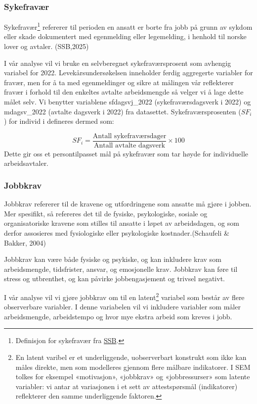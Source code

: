 \documentclass[
  12pt,
  a4paper,
  DIV=11,
  numbers=noendperiod]{scrartcl}
\begin{document}
\subsubsection{Sykefravær}\label{sykefravuxe6r}

Sykefravær\footnote{Definisjon for sykefravær fra
  \href{https://www.ssb.no/arbeid-og-lonn/arbeidsmiljo-sykefravaer-og-arbeidskonflikter/statistikk/sykefravaer}{SSB}.}
refererer til perioden en ansatt er borte fra jobb på grunn av sykdom
eller skade dokumentert med egenmelding eller legemelding, i henhold til
norske lover og avtaler. (SSB,2025)

I vår analyse vil vi bruke en selvberegnet sykefraværsprosent som
avhengig variabel for 2022. Levekårsundersøkelsen inneholder ferdig
aggregerte variabler for fravær, men for å ta med egenmeldinger og sikre
at målingen vår reflekterer fravær i forhold til den enkeltes avtalte
arbeidsmengde så velger vi å lage dette målet selv. Vi benytter
variablene sfdagsvj\_2022 (sykefraværsdagsverk i 2022) og mdagsv\_2022
(avtalte dagsverk i 2022) fra datasettet. Sykefraværsprosenten
(\(SF_i\)) for individ i defineres dermed som:

\[
SF_i = \frac{ \text{Antall sykefraværsdager}}{\text{Antall avtalte dagsverk}}  \times 100
\] Dette gir oss et persontilpasset mål på sykefravær som tar høyde for
individuelle arbeidsavtaler.

\subsubsection{Jobbkrav}\label{jobbkrav}

Jobbkrav refererer til de kravene og utfordringene som ansatte må gjøre
i jobben. Mer spesifikt, så refereres det til de fysiske, psykologiske,
sosiale og organisatoriske kravene som stilles til ansatte i løpet av
arbeidsdagen, og som derfor assosieres med fysiologiske eller
psykologiske kostnader.(Schaufeli \& Bakker, 2004)

Jobbkrav kan være både fysiske og psykiske, og kan inkludere krav som
arbeidsmengde, tidsfrister, ansvar, og emosjonelle krav. Jobbkrav kan
føre til stress og utbrenthet, og kan påvirke jobbengasjement og trivsel
negativt.

I vår analyse vil vi gjøre jobbkrav om til en latent\footnote{En latent
  varibel er et underliggende, uobserverbart konstrukt som ikke kan
  måles direkte, men som modelleres gjennom flere målbare indikatorer. I
  SEM tolkes for eksempel «motivasjon», «jobbkrav» og «jobbressurser»
  som latente variabler: vi antar at variasjonen i et sett av
  attestspørsmål (indikatorer) reflekterer den samme underliggende
  faktoren.} variabel som består av flere observerbare variabler. I
denne variabelen vil vi inkludere variabler som måler arbeidsmengde,
arbeidstempo og hvor mye ekstra arbeid som kreves i jobb.
\end{document}

